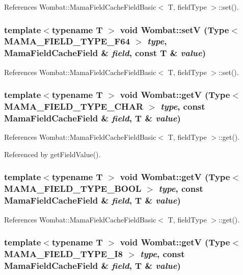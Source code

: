 References Wombat::MamaFieldCacheFieldBasic$<$ T, fieldType $>$::set().\hypertarget{namespaceWombat_aa5cabc1baf9ca64baffb75c48cea1294}{
\subsubsection[{setV}]{\setlength{\rightskip}{0pt plus 5cm}template$<$typename T $>$ void Wombat::setV (Type$<$ MAMA\_\-FIELD\_\-TYPE\_\-F64 $>$ {\em type}, \/  MamaFieldCacheField \& {\em field}, \/  const T \& {\em value})}}
\label{namespaceWombat_aa5cabc1baf9ca64baffb75c48cea1294}


References Wombat::MamaFieldCacheFieldBasic$<$ T, fieldType $>$::set().\hypertarget{namespaceWombat_a3f5716b3686dd27c341d508e2c38ca78}{
\subsubsection[{getV}]{\setlength{\rightskip}{0pt plus 5cm}template$<$typename T $>$ void Wombat::getV (Type$<$ MAMA\_\-FIELD\_\-TYPE\_\-CHAR $>$ {\em type}, \/  const MamaFieldCacheField \& {\em field}, \/  T \& {\em value})}}
\label{namespaceWombat_a3f5716b3686dd27c341d508e2c38ca78}


References Wombat::MamaFieldCacheFieldBasic$<$ T, fieldType $>$::get().

Referenced by getFieldValue().\hypertarget{namespaceWombat_a35a6e844a904961b48e8cc61077085a2}{
\subsubsection[{getV}]{\setlength{\rightskip}{0pt plus 5cm}template$<$typename T $>$ void Wombat::getV (Type$<$ MAMA\_\-FIELD\_\-TYPE\_\-BOOL $>$ {\em type}, \/  const MamaFieldCacheField \& {\em field}, \/  T \& {\em value})}}
\label{namespaceWombat_a35a6e844a904961b48e8cc61077085a2}


References Wombat::MamaFieldCacheFieldBasic$<$ T, fieldType $>$::get().\hypertarget{namespaceWombat_a6a9c57fd79b5cc04510846013c84072b}{
\subsubsection[{getV}]{\setlength{\rightskip}{0pt plus 5cm}template$<$typename T $>$ void Wombat::getV (Type$<$ MAMA\_\-FIELD\_\-TYPE\_\-I8 $>$ {\em type}, \/  const MamaFieldCacheField \& {\em field}, \/  T \& {\em value})}}
\label{namespaceWombat_a6a9c57fd79b5cc04510846013c84072b}


